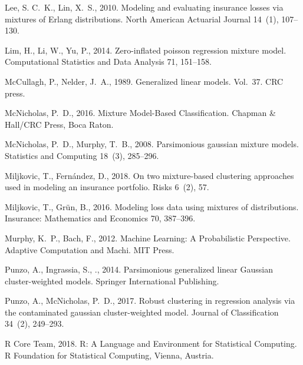 \documentclass[12pt,letterpaper]{article}
\numberwithin{equation}{section}
\numberwithin{equation}{section}
\numberwithin{equation}{section}
\begin{document}
\begin{thebibliography}{36}
Lee, S. C.~K., Lin, X.~S., 2010. Modeling and evaluating insurance losses via
  mixtures of {E}rlang distributions. North American Actuarial Journal 14~(1),
  107--130.

Lim, H., Li, W., Yu, P., 2014. Zero-inflated poisson regression mixture model.
  Computational Statistics and Data Analysis 71, 151--158.

McCullagh, P., Nelder, J.~A., 1989. Generalized linear models. Vol.~37. CRC
  press.

McNicholas, P.~D., 2016. Mixture Model-Based Classification. Chapman \&
  Hall/CRC Press, Boca Raton.

McNicholas, P.~D., Murphy, T.~B., 2008. Parsimonious gaussian mixture models.
  Statistics and Computing 18~(3), 285--296.

Miljkovic, T., Fern{\'a}ndez, D., 2018. On two mixture-based clustering
  approaches used in modeling an insurance portfolio. Risks 6~(2), 57.

Miljkovic, T., Gr\"un, B., 2016. Modeling loss data using mixtures of
  distributions. Insurance: Mathematics and Economics 70, 387--396.

Murphy, K.~P., Bach, F., 2012. Machine Learning: A Probabilistic Perspective.
  Adaptive Computation and Machi. MIT Press.

Punzo, A., Ingrassia, S., ., 2014. Parsimonious generalized linear Gaussian
  cluster-weighted models. Springer International Publishing.

Punzo, A., McNicholas, P.~D., 2017. Robust clustering in regression analysis
  via the contaminated gaussian cluster-weighted model. Journal of
  Classification 34~(2), 249--293.

{R Core Team}, 2018. R: A Language and Environment for Statistical Computing. R
  Foundation for Statistical Computing, Vienna, Austria.


\end{thebibliography}
\end{document}
